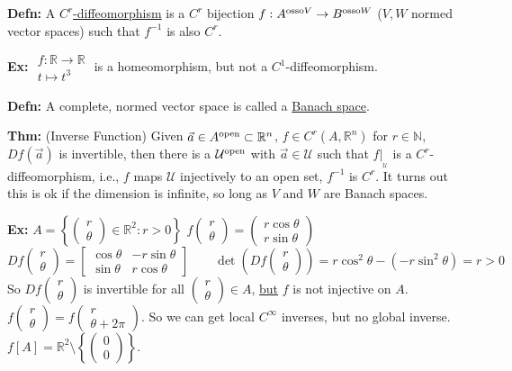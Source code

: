 \documentclass[10pt,letterpaper]{article}
\newcommand{\n}{\hfill\break}
\newcommand{\defn}[1]{\par\noindent\settowidth{\hangindent}{\textbf{Defn: }}\textbf{Defn: }#1\n}
\newcommand{\thm}[1]{\par\noindent\settowidth{\hangindent}{\textbf{Thm: }}\textbf{Thm: }#1\n}
\newcommand{\ex}[1]{\par\noindent\settowidth{\hangindent}{\textbf{Ex: }}\textbf{Ex: }#1\n}
\newcommand{\ptxt}[1]{\textrm{\textnormal{#1}}}
\newcommand{\set}[1]{\left\{#1\right\}}
\newcommand{\naturals}{\mathbb{N}}
\newcommand{\N}{\naturals}
\newcommand{\reals}{\mathbb{R}}
\newcommand{\R}{\reals}
\newcommand{\inv}{^{-1}}
\newcommand{\uball}{\mathcal{U}}
\begin{document}
\defn{A \underline{$C^{r}$-diffeomorphism} is a $C^{r}$ bijection $f:A^{\ptxt{osso}V}\to{}B^{\ptxt{osso}W}$ ($V,W$ normed vector spaces) such that $f\inv$ is also $C^{r}$.}

\ex{$\begin{array}{l}f:\R\to\R\\ t\mapsto{}t^{3}\end{array}$ is a homeomorphism, but not a $C^{1}$-diffeomorphism.}

\defn{A complete, normed vector space is called a \underline{Banach space}.}

\thm{(Inverse Function) Given $\vec{a}\in{}A^{\ptxt{open}}\subset\R^{n}$, $f\in{}C^{r}(A,\R^{n})$ for $r\in\N$, $Df(\vec{a})$ is invertible, then there is a $\uball^{\ptxt{open}}$ with $\vec{a}\in\uball$ such that $f|_{_{\uball}}$ is a $C^{r}$-diffeomorphism, i.e., $f$ maps $\uball$ injectively to an open set, $f\inv$ is $C^{r}$.\n
It turns out this is ok if the dimension is infinite, so long as $V$ and $W$ are Banach spaces.}

\ex{$A=\set{\left(\begin{array}{c}r\\ \theta\end{array}\right)\in\R^{2}:r>0}$\n
$f\left(\begin{array}{c}r\\ \theta\end{array}\right)=\left(\begin{array}{c}r\cos\theta\\ r\sin\theta\end{array}\right)$\n
$Df\left(\begin{array}{c}r\\ \theta\end{array}\right)=\left[\begin{array}{cc}\cos\theta & -r\sin\theta\\ \sin\theta & r\cos\theta\end{array}\right]\qquad\det\left(Df\left(\begin{array}{c}r\\ \theta\end{array}\right)\right)=r\cos^{2}\theta-(-r\sin^{2}\theta)=r>0$\n
So $Df\left(\begin{array}{c}r\\ \theta\end{array}\right)$ is invertible for all $\left(\begin{array}{c}r\\ \theta\end{array}\right)\in{}A$, \underline{but} $f$ is not injective on $A$.\n
$f\left(\begin{array}{c}r\\ \theta\end{array}\right)=f\left(\begin{array}{c}r\\ \theta+2\pi\end{array}\right)$. So we can get local $C^{\infty}$ inverses, but no global inverse.\n
$f[A]=\R^{2}\setminus\set{\left(\begin{array}{c}0\\ 0\end{array}\right)}$.}
\end{document}
